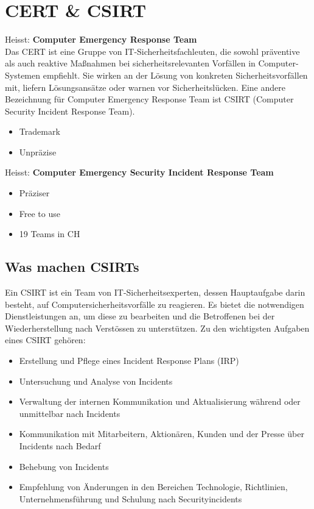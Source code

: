 \section{CERT \& CSIRT}
Heisst: \textbf{Computer Emergency Response Team}\\
Das CERT ist eine Gruppe von IT-Sicherheitsfachleuten, die sowohl präventive als auch reaktive Maßnahmen bei sicherheitsrelevanten Vorfällen in Computer-Systemen empfiehlt.
Sie wirken an der Lösung von konkreten Sicherheitsvorfällen mit, liefern Lösungsansätze oder warnen vor Sicherheitslücken.
Eine andere Bezeichnung für Computer Emergency Response Team ist CSIRT (Computer Security Incident Response Team).
\begin{itemize}
  \item Trademark
  \item Unpräzise
\end{itemize}

Heisst: \textbf{Computer Emergency Security Incident Response Team}\\
\begin{itemize}
  \item Präziser
  \item Free to use
  \item 19 Teams in CH
\end{itemize}

\subsection{Was machen CSIRTs}
Ein CSIRT ist ein Team von IT-Sicherheitsexperten, dessen Hauptaufgabe darin besteht, auf Computersicherheitsvorfälle zu reagieren. 
Es bietet die notwendigen Dienstleistungen an, um diese zu bearbeiten und die Betroffenen bei der Wiederherstellung nach Verstössen zu unterstützen.
Zu den wichtigsten Aufgaben eines CSIRT gehören:
\begin{itemize}
  \item Erstellung und Pflege eines Incident Response Plans (IRP)
  \item Untersuchung und Analyse von Incidents
  \item Verwaltung der internen Kommunikation und Aktualisierung während oder unmittelbar nach Incidents
  \item Kommunikation mit Mitarbeitern, Aktionären, Kunden und der Presse über Incidents nach Bedarf
  \item Behebung von Incidents
  \item Empfehlung von Änderungen in den Bereichen Technologie, Richtlinien, Unternehmensführung und Schulung nach Securityincidents
\end{itemize}


